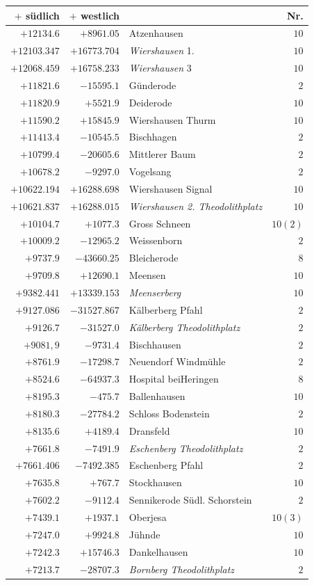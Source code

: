 \begin{center}\begingroup\fontsize{8}{9}\selectfont
\setlength{\tabcolsep}{4pt}
\begin{tabular}{r|r|p{170pt}|r}\hline
\(+\) südlich&\(+\) westlich&&Nr.\\\hline
\(+12134.6\)&\(+8961.05\)&Atzenhausen&\(10\)\\
\(+12103.347\)&\(+16773.704\)&\textit{Wiershausen} 1.&\(10\)\\
\(+12068.459\)&\(+16758.233\)&\textit{Wiershausen} 3&\(10\)\\
\(+11821.6\)&\(-15595.1\)&Günderode&\(2\)\\
\(+11820.9\)&\(+5521.9\)&Deiderode&\(10\)\\
\(+11590.2\)&\(+15845.9\)&Wiershausen Thurm&\(10\)\\
\(+11413.4\)&\(-10545.5\)&Bischhagen&\(2\)\\
\(+10799.4\)&\(-20605.6\)&Mittlerer Baum&\(2\)\\
\(+10678.2\)&\(-9297.0\)&Vogelsang&\(2\)\\
\(+10622.194\)&\(+16288.698\)&Wiershausen Signal&\(10\)\\
\(+10621.837\)&\(+16288.015\)&\textit{Wiershausen 2. Theodolithplatz}&\(10\)\\
\(+10104.7\)&\(+1077.3\)&Gross Schneen&\(10(2)\)\\
\(+10009.2\)&\(-12965.2\)&Weissenborn&\(2\)\\
\(+9737.9\)&\(-43660.25\)&Bleicherode&\(8\)\\
\(+9709.8\)&\(+12690.1\)&Meensen&\(10\)\\
\(+9382.441\)&\(+13339.153\)&\textit{Meenserberg}&\(10\)\\
\(+9127.086\)&\(-31527.867\)&Kälberberg Pfahl&\(2\)\\
\(+9126.7\)&\(-31527.0\)&\textit{Kälberberg Theodolithplatz}&\(2\)\\
\(+9081{,}9\)&\(-9731.4\)&Bischhausen&\(2\)\\
\(+8761.9\)&\(-17298.7\)&Neuendorf Windmühle&\(2\)\\
\(+8524.6\)&\(-64937.3\)&Hospital beiHeringen&\(8\)\\
\(+8195.3\)&\(-475.7\)&Ballenhausen&\(10\)\\
\(+8180.3\)&\(-27784.2\)&Schloss Bodenstein&\(2\)\\
\(+8135.6\)&\(+4189.4\)&Dransfeld&\(10\)\\
\(+7661.8\)&\(-7491.9\)&\textit{Eschenberg Theodolithplatz}&\(2\)\\
\(+7661.406\)&\(-7492.385\)&Eschenberg Pfahl&\(2\)\\
\(+7635.8\)&\(+767.7\)&Stockhausen&\(10\)\\
\(+7602.2\)&\(-9112.4\)&Sennikerode Südl. Schorstein&\(2\)\\
\(+7439.1\)&\(+1937.1\)&Oberjesa&\(10(3)\)\\
\(+7247.0\)&\(+9924.8\)&Jühnde&\(10\)\\
\(+7242.3\)&\(+15746.3\)&Dankelhausen&\(10\)\\
\(+7213.7\)&\(-28707.3\)&\textit{Bornberg Theodolithplatz}&\(2\)\\
\hline\end{tabular}\endgroup\end{center}
